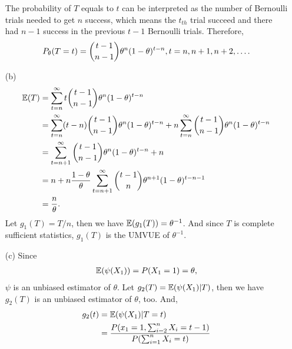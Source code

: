 \documentclass{article}
\begin{document}
\begin{CJK}{UTF8}{gbsn}
\begin{itemize}
              The probability of $T$ equals to $t$ can be interpreted as the number of Bernoulli trials needed to get $n$ success,
              which means the $t_{th}$ trial succeed and there had $n-1$ success in the previous $t-1$ Bernoulli trials.
              Therefore,
              \begin{align}
                  P_{\theta}(T=t) = \binom{t-1}{n-1}\theta^n(1-\theta)^{t-n}, t=n, n+1, n+2, \ldots.\notag
              \end{align}
        \item [(b)]
              \begin{align}
                  {\mathbb E}(T) & = \sum_{t=n}^{\infty} t \binom{t-1}{n-1} \theta^n(1-\theta)^{t-n} \notag                                                                         \\
                         & = \sum_{t=n}^{\infty} (t-n) \binom{t-1}{n-1} \theta^n(1-\theta)^{t-n} + n \sum_{t=n}^{\infty} \binom{t-1}{n-1} \theta^{n}(1-\theta)^{t-n} \notag \\
                         & = \sum_{t=n+1}^{\infty} \binom{t-1}{n-1} \theta^{n}(1-\theta)^{t-n} + n \notag                                                                   \\
                         & = n + n \frac{1-\theta}{\theta} \sum_{t=n+1}^{\infty} \binom{t-1}{n} \theta^{n+1}(1-\theta)^{t-n-1} \notag                                       \\
                         & = \frac{n}{\theta}.\notag
              \end{align}
              Let $g_1(T) = T/n$, then we have ${\mathbb E}(g_1(T)) = \theta^{-1}$.
              And since $T$ is complete sufficient statistics, $g_1(T)$ is the UMVUE of $\theta^{-1}$.
        \item [(c)]
              Since
              \begin{align}
                  {\mathbb E}(\psi(X_1))  = P(X_1=1) = \theta, \notag
              \end{align}
              $\psi$ is an unbiased estimator of $\theta$.
              Let $g_2(T) = {\mathbb E}(\psi(X_1)|T)$, then we have $g_2(T)$ is an unbiased estimator of $\theta$, too.
              And,
              \begin{align}
                  g_2(t) & = \EE(\psi(X_1)|T=t) \notag                                                                                         \\
                         & = \frac{P(x_1=1, \sum_{i=2}^n X_i = t-1)}{P(\sum_{i=1}^n X_i=t)} \notag                                             \\

\end{align}
\end{itemize}
\end{CJK}
\end{document}
